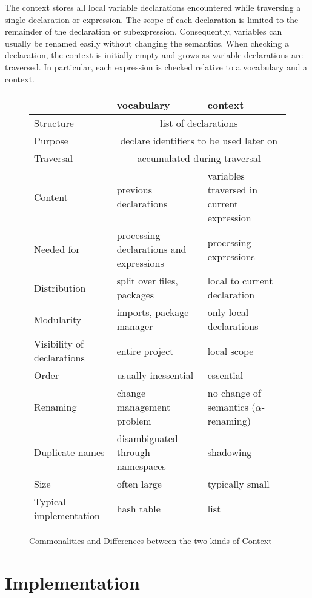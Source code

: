 The context stores all local variable declarations encountered while traversing a single declaration or expression.
The scope of each declaration is limited to the remainder of the declaration or subexpression.
Consequently, variables can usually be renamed easily without changing the semantics.
When checking a declaration, the context is initially empty and grows as variable declarations are traversed.
In particular, each expression is checked relative to a vocabulary and a context.

\begin{figure}[hbt]
\begin{center}
\begin{tabular}{l|ll}
& vocabulary & context \\
\hline
Structure & \multicolumn{2}{c}{list of declarations} \\
Purpose & \multicolumn{2}{c}{declare identifiers to be used later on} \\
Traversal & \multicolumn{2}{c}{accumulated during traversal} \\
\hline
Content & previous declarations & variables traversed in current expression \\
Needed for & processing declarations and expressions & processing expressions \\
Distribution & split over files, packages & local to current declaration \\
Modularity & imports, package manager & only local declarations \\
Visibility of declarations & entire project & local scope \\
Order & usually inessential & essential \\
Renaming & change management problem & no change of semantics ($\alpha$-renaming) \\
Duplicate names & disambiguated through namespaces & shadowing \\
Size & often large & typically small \\
Typical implementation & hash table & list \\
\end{tabular}
\caption{Commonalities and Differences between the two kinds of Context}\label{fig:vocctx}
\end{center}
\end{figure}

\section{Implementation}

